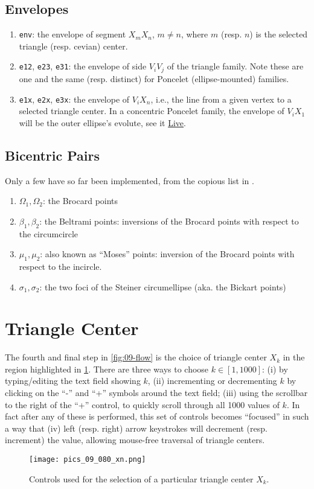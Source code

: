 \subsection{Envelopes}

\begin{enumerate}
\item \texttt{env}: the envelope of segment $X_m X_n$, $m{\neq}n$, where $m$ (resp. $n$) is the selected triangle (resp. cevian) center. 
\item \texttt{e12}, \texttt{e23}, \texttt{e31}: the envelope of side $V_i V_j$ of the triangle family. Note these are one and the same (resp. distinct) for Poncelet (ellipse-mounted) families. 
\item \texttt{e1x}, \texttt{e2x}, \texttt{e3x}: the envelope of $V_i X_n$, i.e., the line from a given vertex to a selected triangle center. In a concentric Poncelet family, the envelope of $V_i X_1$ will be the outer ellipse's evolute, see it \href{https://bit.ly/3fNKV2P}{Live}.
\end{enumerate}

\subsection{Bicentric Pairs}

Only a few have so far been implemented, from the copious list in \cite{kimberling2020-bicentric}.

\begin{enumerate}
 \item $\Omega_1,\Omega_2$: the Brocard points
    \item $\beta_1,\beta_2$: the Beltrami points: inversions of the Brocard points with respect to the circumcircle
    \item $\mu_1,\mu_2$: also known as ``Moses'' points: inversion of the Brocard points with respect to the incircle.
    \item $\sigma_1,\sigma_2$: the two foci of the Steiner circumellipse (aka. the Bickart points)
\end{enumerate}

\section{Triangle Center}
\label{sec:09-triangle-center}

The fourth and final step in \cref{fig:09-flow} is the choice of triangle center $X_k$ in the region highlighted in \cref{fig:09-menu-xn}. There are three ways to choose $k\in[1,1000]$: (i) by typing/editing the text field showing $k$, (ii) incrementing or decrementing $k$ by clicking on the ``-'' and ``+'' symbols around the text field; (iii) using the scrollbar to the right of the ``+'' control, to quickly scroll through all 1000 values of $k$. In fact after any of these is performed, this set of controls becomes ``focused'' in such a way that (iv) left (resp. right) arrow keystrokes will decrement (resp. increment) the value, allowing mouse-free traversal of triangle centers.

\begin{figure}
    \centering
    \texttt{[image: pics\_09\_080\_xn.png]}
    \caption{Controls used for the selection of a particular triangle center $X_k$.}
    \label{fig:09-menu-xn}
\end{figure}


